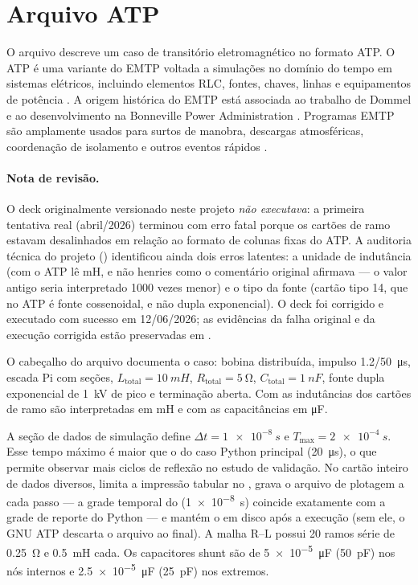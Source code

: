\section{Arquivo ATP}

O arquivo  descreve um caso de transitório eletromagnético no formato ATP. O ATP é uma variante do EMTP voltada a simulações no domínio do tempo em sistemas elétricos, incluindo elementos RLC, fontes, chaves, linhas e equipamentos de potência \cite{atpdrawhelp}. A origem histórica do EMTP está associada ao trabalho de Dommel e ao desenvolvimento na Bonneville Power Administration \cite{dommel1969,emtp_history}. Programas EMTP são amplamente usados para surtos de manobra, descargas atmosféricas, coordenação de isolamento e outros eventos rápidos \cite{long1990}.

\paragraph{Nota de revisão.} O deck originalmente versionado neste projeto \emph{não executava}: a primeira tentativa real (abril/2026) terminou com erro fatal  porque os cartões de ramo estavam desalinhados em relação ao formato de colunas fixas do ATP. A auditoria técnica do projeto () identificou ainda dois erros latentes: a unidade de indutância (com  o ATP lê mH, e não henries como o comentário original afirmava — o valor antigo seria interpretado 1000 vezes menor) e o tipo da fonte (cartão tipo 14, que no ATP é fonte cossenoidal, e não dupla exponencial). O deck foi corrigido e executado com sucesso em 12/06/2026; as evidências da falha original e da execução corrigida estão preservadas em .

O cabeçalho do arquivo documenta o caso: bobina distribuída, impulso 1.2/50~\si{\micro\second}, escada Pi com \Nsec{} seções, \(L_{\mathrm{total}}=\SI{10}{mH}\), \(R_{\mathrm{total}}=\SI{5}{\ohm}\), \(C_{\mathrm{total}}=\SI{1}{nF}\), fonte dupla exponencial de \SI{1}{kV} de pico e terminação aberta. Com  as indutâncias dos cartões de ramo são interpretadas em \si{mH} e com  as capacitâncias em \si{\micro F}.

A seção de dados de simulação define \(\Delta t=\SI{1e-8}{s}\) e \(T_{\max}=\SI{2e-4}{s}\). Esse tempo máximo é maior que o  do caso Python principal (\SI{20}{\micro\second}), o que permite observar mais ciclos de reflexão no estudo de validação. No cartão inteiro de dados diversos,  limita a impressão tabular no ,  grava o arquivo de plotagem a cada passo — a grade temporal do  (\SI{1e-8}{s}) coincide exatamente com a grade de reporte do Python — e  mantém o  em disco após a execução (sem ele, o GNU ATP descarta o arquivo ao final). A malha R--L possui 20 ramos série de \SI{0.25}{\ohm} e \SI{0.5}{mH} cada. Os capacitores shunt são de \SI{5e-5}{\micro F} (\SI{50}{pF}) nos nós internos e \SI{2.5e-5}{\micro F} (\SI{25}{pF}) nos extremos.

